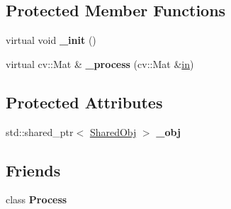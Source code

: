 \subsection*{\-Protected \-Member \-Functions}
\begin{DoxyCompactItemize}
\item 
\hypertarget{classs9_1_1compvis_1_1ProcessBlock_acab5d2b56bde92aa973567b3eded1a31}{virtual void {\bfseries \-\_\-init} ()}\label{classs9_1_1compvis_1_1ProcessBlock_acab5d2b56bde92aa973567b3eded1a31}

\item 
\hypertarget{classs9_1_1compvis_1_1ProcessBlock_a7765b466423cb62ad33391f96fc2490f}{virtual cv\-::\-Mat \& {\bfseries \-\_\-process} (cv\-::\-Mat \&\hyperlink{structin}{in})}\label{classs9_1_1compvis_1_1ProcessBlock_a7765b466423cb62ad33391f96fc2490f}

\end{DoxyCompactItemize}
\subsection*{\-Protected \-Attributes}
\begin{DoxyCompactItemize}
\item 
\hypertarget{classs9_1_1compvis_1_1ProcessBlock_a19eb31603bfc96501b668474d442f7e7}{std\-::shared\-\_\-ptr$<$ \hyperlink{structs9_1_1compvis_1_1ProcessBlock_1_1SharedObj}{\-Shared\-Obj} $>$ {\bfseries \-\_\-obj}}\label{classs9_1_1compvis_1_1ProcessBlock_a19eb31603bfc96501b668474d442f7e7}

\end{DoxyCompactItemize}
\subsection*{\-Friends}
\begin{DoxyCompactItemize}
\item 
\hypertarget{classs9_1_1compvis_1_1ProcessBlock_a7a4d413df5afafea63a3532759beeaa7}{class {\bfseries \-Process}}\label{classs9_1_1compvis_1_1ProcessBlock_a7a4d413df5afafea63a3532759beeaa7}

\end{DoxyCompactItemize}



